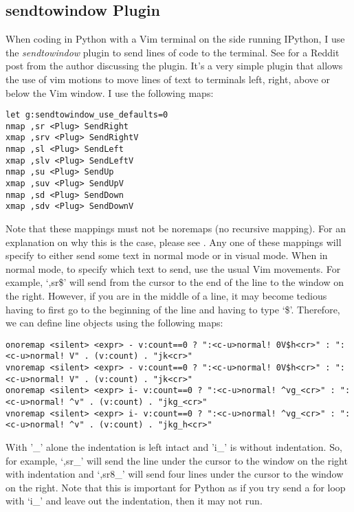 \documentclass[10pt]{article}
\begin{document}
\subsection{sendtowindow Plugin}
When coding in Python with a Vim terminal on the side running IPython, I use the \textit{sendtowindow} plugin
\cite{KKPMW2016send} to send lines of code to the terminal. See \cite{KKPMW2019send} for a Reddit post from the author
discussing the plugin. It's a very simple plugin that allows the use of vim motions to move lines of text to terminals
left, right, above or below the Vim window. I use the following maps:\\
\begin{lstlisting}
let g:sendtowindow_use_defaults=0
nmap ,sr <Plug> SendRight
xmap ,srv <Plug> SendRightV
nmap ,sl <Plug> SendLeft
xmap ,slv <Plug> SendLeftV
nmap ,su <Plug> SendUp
xmap ,suv <Plug> SendUpV
nmap ,sd <Plug> SendDown
xmap ,sdv <Plug> SendDownV
\end{lstlisting}
Note that these mappings must not be noremaps (no recursive mapping). For an explanation on why this is the case,
please see \cite{justrajdeep2018please}. Any one of these mappings will specify to either send some text in normal mode
or in visual mode. When in normal mode, to specify which text to send, use the usual Vim movements. For example,
`,sr\$' will send from the cursor to the end of the line to the window on the right. However, if you are in the middle
of a line, it may become tedious having to first go to the beginning of the line and having to type `\$'. Therefore, we
can define line objects using the following maps:
\begin{lstlisting}
onoremap <silent> <expr> - v:count==0 ? ":<c-u>normal! 0V$h<cr>" : ":<c-u>normal! V" . (v:count) . "jk<cr>"
vnoremap <silent> <expr> - v:count==0 ? ":<c-u>normal! 0V$h<cr>" : ":<c-u>normal! V" . (v:count) . "jk<cr>"
onoremap <silent> <expr> i- v:count==0 ? ":<c-u>normal! ^vg_<cr>" : ":<c-u>normal! ^v" . (v:count) . "jkg_<cr>"
vnoremap <silent> <expr> i- v:count==0 ? ":<c-u>normal! ^vg_<cr>" : ":<c-u>normal! ^v" . (v:count) . "jkg_h<cr>"
\end{lstlisting}
With '\_' alone the indentation is left intact and 'i\_' is without indentation. So, for example, `,sr\_' will send
the line under the cursor to the window on the right with indentation and `,sr8\_' will send four lines under the
cursor to the window on the right. Note that this is important for Python as if you try send a for loop with `i\_' and
leave out the indentation, then it may not run.\\
\end{document}
